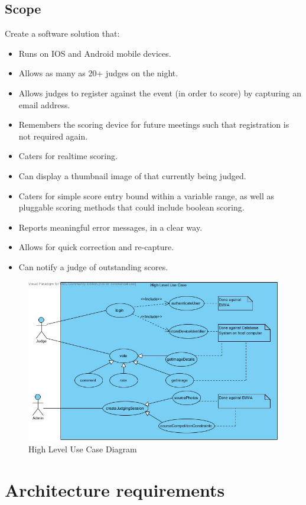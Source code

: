 \documentclass[10pt,a4paper]{article}
\begin{document}
\subsection{Scope}
Create a software solution that:
\begin{itemize}
\item Runs on IOS and Android mobile devices.
\item Allows as many as 20+ judges on the night.
\item Allows judges to register against the event (in order to score) by capturing an email address.
\item Remembers the scoring device for future meetings such that registration is not required again.
\item Caters for realtime scoring.
\item Can display a thumbnail image of that currently being judged.
\item Caters for simple score entry bound within a variable range, as well as pluggable scoring methods that could include boolean scoring.
\item Reports meaningful error messages, in a clear way.
\item Allows for quick correction and re-capture.
\item Can notify a judge of outstanding scores.
\end{itemize}

\begin{figure}  
\includegraphics[scale=0.6]{Pictures/HighLevelUseCase.jpg}
\caption[Long caption]{High Level Use Case Diagram}
\label{pic-a}
\end{figure}
\pagebreak
\section{Architecture requirements}
\end{document}
